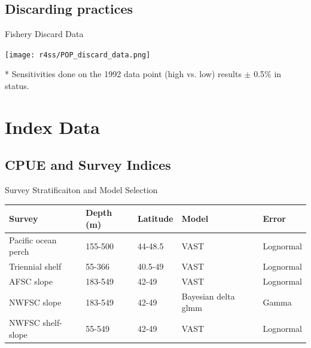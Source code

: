 \documentclass[pdf]{beamer}\usepackage[]{graphicx}\usepackage[]{color}
\begin{document}
\subsection{Discarding practices}
\begin{frame}{Fishery Discard Data}
  \begin{center}
    \texttt{[image: r4ss/POP\_discard\_data.png]}
  \end{center}
  * \small{Sensitivities done on the 1992 data point (high vs. low) results $\pm$ 0.5\%  in status.}
\end{frame}

\section{Index Data}

\subsection{CPUE and Survey Indices}
\begin{frame}{Survey Stratificaiton and Model Selection}
  \begin{table}[ht]
  \small
  \centering
  \begin{tabular}{p{1.15in}p{0.65in}p{0.5in}p{0.5in}p{0.75in}}
  Survey & Depth (m) & Latitude & Model & Error  \\ 
  \hline
  Pacific ocean perch & 155-500 & 44-48.5 & VAST & Lognormal \\
  Triennial shelf & 55-366 & 40.5-49 & VAST & Lognormal\\ 
  AFSC slope & 183-549 & 42-49 & VAST & Lognormal \\ 
  NWFSC slope & 183-549 & 42-49 & Bayesian delta glmm & Gamma \\
  NWFSC shelf-slope & 55-549 & 42-49 & VAST & Lognormal \\
  \hline
  \end{tabular}
  \end{table}
\end{frame}
\end{document}
